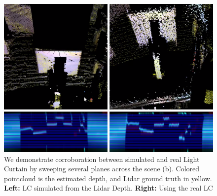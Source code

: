 \begin{figure}
   \centering
   \begin{minipage}{0.4\textwidth}
       \centering
       \includegraphics[width=1.0\textwidth]{figures/sweep.png}
   \end{minipage}\hfill
   \centering
   \caption{We demonstrate corroboration between simulated and real Light Curtain by sweeping several planes across the scene (b). Colored pointcloud is the estimated depth, and Lidar ground truth in yellow. \textbf{Left:} LC simulated from the Lidar Depth. \textbf{Right:} Using the real LC}
   \label{fig:planarsweep}
\end{figure}

